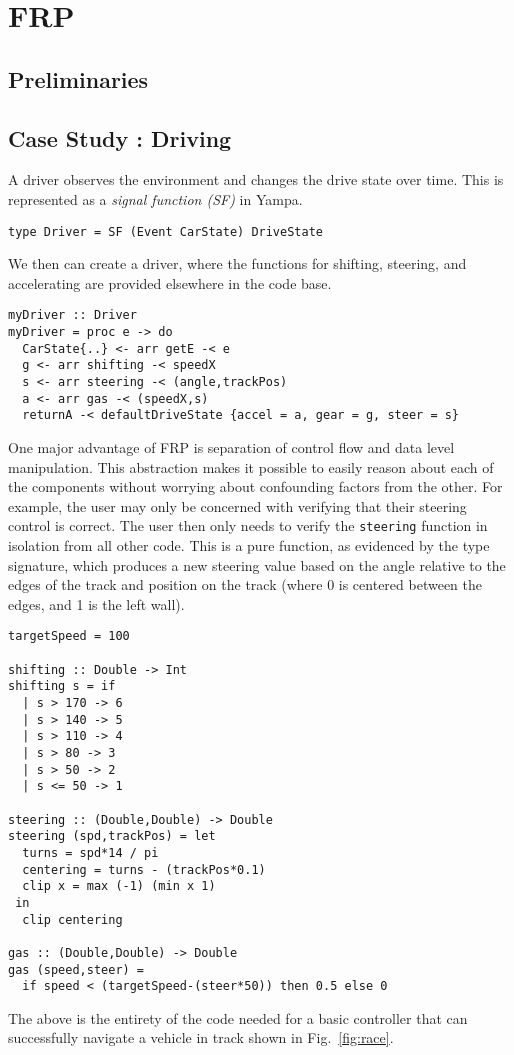 \section{FRP}

\subsection{Preliminaries}


\subsection{Case Study : Driving}
A driver observes the environment and changes the drive state over time.
This is represented as a \textit{signal function (SF)} in Yampa.

\begin{lstlisting}
type Driver = SF (Event CarState) DriveState
\end{lstlisting}

We then can create a driver, where the functions for shifting, steering, and accelerating are provided elsewhere in the code base.

\begin{lstlisting}
myDriver :: Driver
myDriver = proc e -> do
  CarState{..} <- arr getE -< e
  g <- arr shifting -< speedX
  s <- arr steering -< (angle,trackPos)
  a <- arr gas -< (speedX,s)
  returnA -< defaultDriveState {accel = a, gear = g, steer = s}
\end{lstlisting}

One major advantage of FRP is separation of control flow and data level manipulation. 
This abstraction makes it possible to easily reason about each of the components without worrying about confounding factors from the other.
For example, the user may only be concerned with verifying that their steering control is correct.
The user then only needs to verify the \texttt{steering} function in isolation from all other code.
This is a pure function, as evidenced by the type signature, which produces a new steering value based on the angle relative to the edges of the track and position on the track (where 0 is centered between the edges, and 1 is the left wall).

\begin{lstlisting}
targetSpeed = 100

shifting :: Double -> Int
shifting s = if 
  | s > 170 -> 6
  | s > 140 -> 5
  | s > 110 -> 4
  | s > 80 -> 3
  | s > 50 -> 2
  | s <= 50 -> 1
 
steering :: (Double,Double) -> Double
steering (spd,trackPos) = let
  turns = spd*14 / pi
  centering = turns - (trackPos*0.1)
  clip x = max (-1) (min x 1)
 in
  clip centering
  
gas :: (Double,Double) -> Double
gas (speed,steer) = 
  if speed < (targetSpeed-(steer*50)) then 0.5 else 0
\end{lstlisting}

The above is the entirety of the code needed for a basic controller that can successfully navigate a vehicle in track shown in Fig.~\ref{fig:race}.
